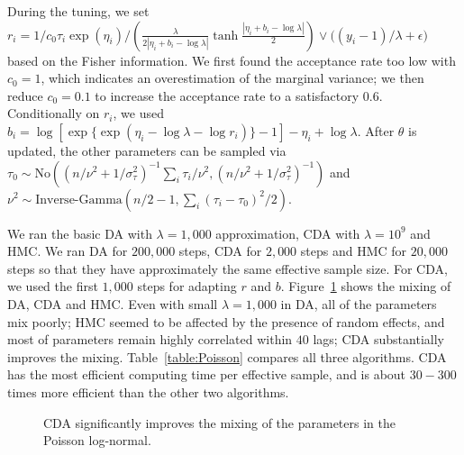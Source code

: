 \documentclass[11pt]{article}
\newcommand{\No}{\text{No}}
\newcommand{\IG}{\text{Inverse-Gamma}}
\begin{document}
During the tuning, we set $r_i = 1/c_0 \tau_i\exp(\eta_i) /  \left( \frac{\lambda } {2|\eta_i + b_i - \log\lambda|}  \tanh\frac{ |\eta_i + b_i - \log\lambda|}{2} \right ) \vee \big( (y_i-1)/\lambda + \epsilon \big)$ based on the Fisher information. We first found the acceptance rate too low with $c_0 =1$, which indicates an overestimation of the marginal variance; we then reduce $c_0=0.1$ to increase the acceptance rate to a satisfactory $0.6$. Conditionally on $r_i$, we used $b_i=\log[ \exp \{ \exp(\eta_i - \log\lambda -\log r_i)   \}-1] -\eta_i + \log\lambda$. After $\theta$ is updated, the other parameters can be sampled via $\tau_0\sim \No\left( (n/ \nu^2 + 1/ \sigma^2_\tau)^{-1} \sum_i \tau_i/\nu^2 , (n/ \nu^2 + 1/ \sigma^2_\tau)^{-1}  \right)$ and $\nu^2 \sim \IG ( n/2-1, \sum_i (\tau_i-\tau_0)^2 /2)$.


We ran the basic DA with $\lambda=1,000$ approximation, CDA with $\lambda=10^9$ and HMC. We ran DA for $200,000$ steps, CDA for $2,000$ steps and HMC for $20,000$ steps so that they have approximately the same effective sample size. For CDA, we used the first $1,000$ steps for adapting $r$ and $b$. Figure~\ref{data_poisson} shows the mixing of DA, CDA and HMC. Even with small $\lambda = 1,000$ in DA, all of the parameters mix poorly; HMC seemed to be affected by the presence of random effects, and most of parameters remain highly correlated within $40$ lags; CDA substantially improves the mixing. Table~\ref{table:Poisson} compares all three algorithms. CDA has the most efficient computing time per effective sample, and is about $30-300$ times more efficient than the other two algorithms.

\begin{figure}[H]
  {\caption{CDA significantly improves the mixing of the parameters in the Poisson log-normal. \label{data_poisson}}}
  {%
    \qquad
     \qquad
  }
\end{figure}
 
\end{document}
